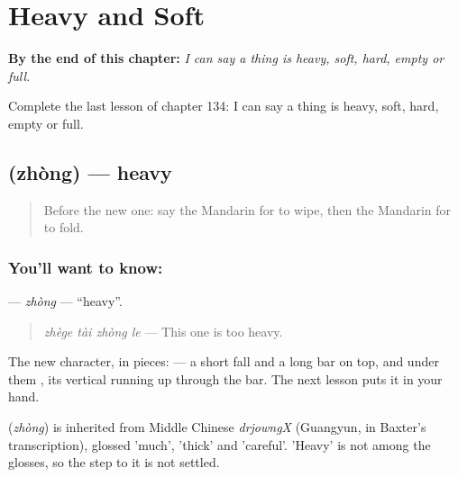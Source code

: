 
\chapter{Heavy and Soft}
\label{ch:zh-heavy-and-soft}

\begin{chapteropening}
\textbf{By the end of this chapter:} \emph{I can say a thing is heavy, soft, hard, empty or full.}

Complete the last lesson of chapter 134: I can say a thing is heavy, soft, hard, empty or full.
\end{chapteropening}

\section[\texorpdfstring{\zh{重} (zhòng)}{重 (zhòng)}]{ (zhòng) — heavy}

\label{lesson:ZH-C134-zhong}



\begin{quote}
Before the new one: say the Mandarin for to wipe, then the Mandarin for to fold.
\end{quote}

\subsection*{You'll want to know: }
\textbf{} — \emph{zhòng} — \textquotedblleft{}heavy\textquotedblright{}.

\begin{quote}
\textbf{} \emph{zhège tài zhòng le} — This one is too heavy.
\end{quote}

The new character, in pieces:  — a short fall and a long bar on top, and under them , its vertical running up through the bar. The next lesson puts it in your hand.

\begin{cousinweb}
\textbf{} (\emph{zhòng}) is inherited from Middle Chinese \emph{drjowngX} (Guangyun, in Baxter's transcription), glossed 'much', 'thick' and 'careful'. 'Heavy' is not among the glosses, so the step to it is not settled.
\end{cousinweb}

